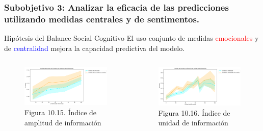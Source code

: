 \documentclass{beamer}
\begin{document}
\begin{frame}
	\frametitle{Subobjetivo 3: Analizar la eficacia de las predicciones utilizando medidas centrales y de sentimentos.}
	\begin{block}{Hipótesis del Balance Social Cognitivo}
El uso conjunto de medidas \textcolor{red}{emocionales} y de \textcolor{blue}{centralidad} mejora la capacidad predictiva del modelo.

	\end{block}
			\begin{columns}[c]
		\begin{column}{.5\textwidth}
			\begin{figure}
				\centering
				\includegraphics[width=1\textwidth]{figs/cap7/figura_53}
\caption{Figura 10.15. Índice de amplitud de información}
			\end{figure}      
		\end{column}
		\begin{column}{.5\textwidth}
			\begin{figure}
				\centering
\includegraphics[width=1\textwidth]{figs/cap7/figura_54}
\caption{Figura 10.16. Índice de unidad de información}
			\end{figure}
		\end{column}
	\end{columns}
	
\end{frame}
\end{document}
